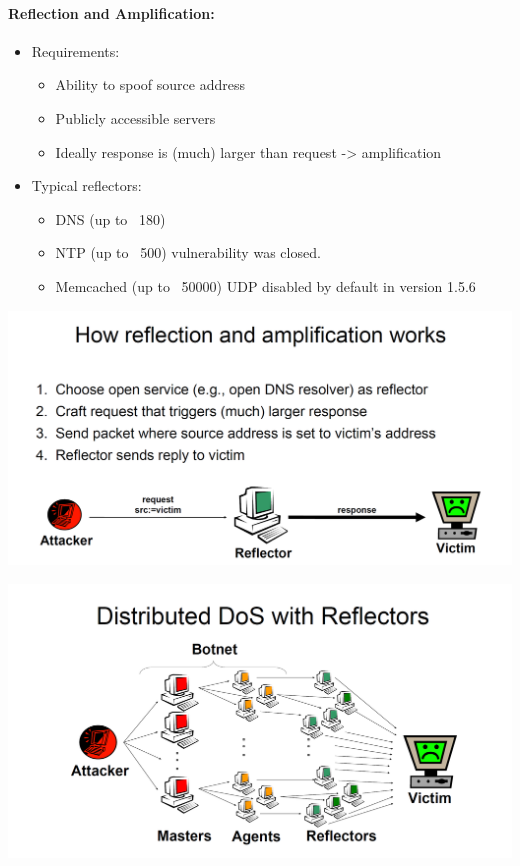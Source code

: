 \paragraph{Reflection and Amplification:}
\begin{itemize}
    \item Requirements:
    \begin{itemize}
        \item Ability to spoof source address
        \item Publicly accessible servers
        \item Ideally response is (much) larger than request -> amplification
    \end{itemize}
    \item Typical reflectors:
    \begin{itemize}
        \item DNS (up to ~180)
        \item NTP (up to ~500) vulnerability was closed.
        \item Memcached (up to ~50000) UDP disabled by default in  version 1.5.6
    \end{itemize}
\end{itemize}

\begin{minipage}{\linewidth}
    \centering      
    \includegraphics[width=\linewidth]{Figures/DDOS_reflection.PNG} 
\end{minipage}

\begin{minipage}{\linewidth}
    \centering      
    \includegraphics[width=\linewidth]{Figures/DDOS_distributed_reflection.PNG} 
\end{minipage}


